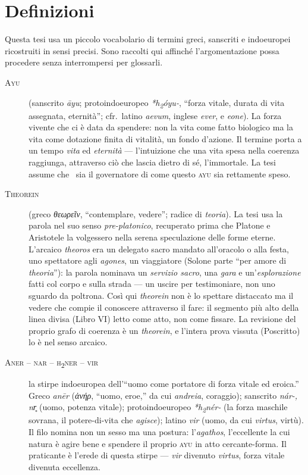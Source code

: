\chapter*{Definizioni}

\noindent Questa tesi usa un piccolo vocabolario di termini greci, sanscriti e
indoeuropei ricostruiti in sensi precisi. Sono raccolti qui affinch\'e
l'argomentazione possa procedere senza interrompersi per glossarli.

\begin{description}

\item[\textsc{Ayu}] (sanscrito \emph{āyu}; protoindoeuropeo \emph{*h\textsubscript{2}óyu-},
``forza vitale, durata di vita assegnata, eternit\`a''; cfr.\ latino \emph{aevum},
inglese \emph{ever}, e \emph{eone}). La forza vivente che ci \`e data da spendere:
non la vita come fatto biologico ma la vita come dotazione finita di vitalit\`a,
un fondo d'azione. Il termine porta a un tempo \emph{vita} ed \emph{eternit\`a}
--- l'intuizione che una vita spesa nella coerenza raggiunga, attraverso ci\`o che
lascia dietro di s\'e, l'immortale. La tesi assume che \physis\ sia il
governatore di come questo \textsc{ayu} sia rettamente speso.

\item[\textsc{Theorein}] (greco \emph{θεωρεῖν}, ``contemplare, vedere''; radice di
\emph{teoria}). La tesi usa la parola nel suo senso \emph{pre-platonico}, recuperato
prima che Platone e Aristotele la volgessero nella serena speculazione delle forme
eterne. L'arcaico \emph{theoros} era un delegato sacro mandato all'oracolo o alla
festa, uno spettatore agli \emph{agones}, un viaggiatore (Solone parte ``per amore di
\emph{theoria}''): la parola nominava un \emph{servizio sacro}, una \emph{gara} e
un'\emph{esplorazione} fatti col corpo e sulla strada --- un uscire per testimoniare,
non uno sguardo da poltrona. Cos\`i qui \emph{theorein} non \`e lo spettare distaccato
ma il vedere che compie il conoscere attraverso il fare: il segmento pi\`u alto della
linea divisa (Libro VI) letto come atto, non come fissare. La revisione del proprio
grafo di coerenza \`e un \emph{theorein}, e l'intera prova vissuta (Poscritto) lo \`e
nel senso arcaico.

\item[\textsc{Aner -- nar -- h\textsubscript{2}ner -- vir}] la stirpe indoeuropea
dell'``uomo come portatore di forza vitale ed eroica.'' Greco \emph{anēr}
(\emph{ἀνήρ}, ``uomo, eroe,'' da cui \emph{andreia}, coraggio); sanscrito
\emph{nár-, nr̥} (uomo, potenza vitale); protoindoeuropeo
\emph{*h\textsubscript{2}nér-} (la forza maschile sovrana, il potere-di-vita che
\emph{agisce}); latino \emph{vir} (uomo, da cui \emph{virtus}, virt\`u). Il filo
nomina non un sesso ma una postura: l'\emph{agathos}, l'eccellente la cui natura
\`e agire bene e spendere il proprio \textsc{ayu} in atto cercante-forma. Il
praticante \`e l'erede di questa stirpe --- \emph{vir} divenuto \emph{virtus},
forza vitale divenuta eccellenza.


\end{description}
